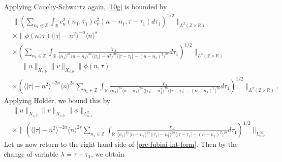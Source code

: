 \documentclass[12pt,reqno]{amsart}
\numberwithin{equation}{section}  %
\numberwithin{figure}{section}
\newcommand{\rr}{\mathbb{R}}
\newcommand{\zz}{\mathbb{Z}}
\theoremstyle{plain}
\theoremstyle{definition}
\theoremstyle{remark}
\begin{document}
%
%
Applying Cauchy-Schwartz again, \eqref{10g} is bounded by
%
%
\begin{equation*}
  \begin{split}
  & \|\left( \sum_{n_{1} \in \zz }\int_{\rr } c_{u}^{2}(n_1, \tau_1)
  c_{v}^{2} (n - n_1, \tau - \tau_{1} ) d \tau_1  \right)^{1/2} \|_{L^{2}(\zz \times
		\rr)}
		\\
    & \times  \|\phi(n, \tau) \langle | \tau | - n^{2} \rangle ^{-a} \langle n
    \rangle ^{s}
		\\
    & \times \left( \sum_{n_{1} \in \zz} \int_{\rr} \frac{\chi_{A}}{ \langle n_{1}
    \rangle ^{2s} \langle n-n_{1} \rangle ^{2s} \langle | \tau_{1}|-n_{1}^{2}
    \rangle^{2b} \langle  |\tau -
    \tau_{1} | -(n - n_{1})^{2}
    \rangle^{2b} } d \tau_1 \right)^{1/2} \|_{L^2(\zz \times \rr)}
		\\
    & = \|u\|_{X_{s,b}} \|v\|_{X_{s,b}} \label{holder-term}
     \|\phi(n, \tau)     \\
    & \times \left( \langle | \tau | - n^{2} \rangle ^{-2a} \langle n
    \rangle ^{2s}
    \sum_{n_{1} \in \zz} \int_{\rr} \frac{\chi_{A}}{ \langle n_{1} \rangle ^{2s} \langle
n-n_{1} \rangle ^{2s}  \langle | \tau_{1}|-n_{1}^{2} \rangle^{2b} \langle  |\tau -
    \tau_{1} | -(n - n_{1})^{2}
    \rangle^{2b} } d \tau_1 \right)^{1/2} \|_{L^2(\zz \times \rr)}.
  \end{split}
\end{equation*}
%
Applying H{\"o}lder, we bound this by 
%
%
\begin{equation}
  \label{integral-bound-1st-form-per}
	\begin{split}
    & \|u\|_{X_{s,b}} \|v\|_{X_{s,b}} \| \phi \|_{L^{2}_{n, \tau}}
    \\
    & \times \|\left( \langle | \tau | - n^{2} \rangle ^{-2a} \langle n
    \rangle ^{2s}
    \sum_{n_{1} \in \zz} \int_{\rr} \frac{\chi_{A}}{ \langle n_{1} \rangle ^{2s} \langle
n-n_{1} \rangle ^{2s} \langle | \tau_{1}|-n_{1}^{2} \rangle^{2b} \langle  |\tau -
    \tau_{1} | -(n - n_{1})^{2}
    \rangle ^{2b} } d \tau_1 \right)^{1/2} \|_{L^\infty_{n, \tau}}
	\end{split}
\end{equation}
%
%
Let us now return to the right hand side of \eqref{pre-fubini-int-form}.
Then by the change of variable $\lambda =
\tau - \tau_{1}$, we obtain
\end{document}
